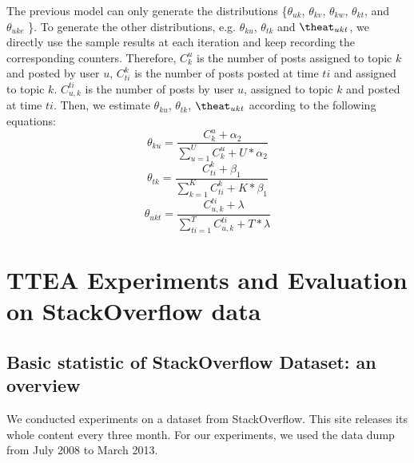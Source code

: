 {{{{{{{The previous model can only generate the distributions \{$\theta_{uk}$, $\theta_{kv}$, $\theta_{kw}$, $\theta_{kt}$, and $\theta_{uke}$ \}. To generate the other distributions, e.g. $\theta_{ku}$, $\theta_{tk}$ and $\theat_{ukt}$, we directly use the sample results at each iteration and keep recording the corresponding counters. Therefore, $C_k^u$ is the number of posts assigned to topic $k$ and posted by user $u$, $C_{ti}^k$ is the number of posts posted at time $ti$ and assigned to topic $k$. $C_{u,k}^{ti}$ is the number of posts by user $u$, assigned to topic $k$ and posted at time $ti$.
Then, we estimate $\theta_{ku}$, $\theta_{tk}$, $\theat_{ukt}$ according to the following equations:
\begin{equation}%
\theta_{ku}=\frac{ C_k^u + \alpha_2 }{ \sum_{u=1}^U C_k^u+ U* \alpha_2} 
\end{equation}
\begin{equation}%
\theta_{tk}=\frac{ C_{ti}^{k} + \beta_1 }{ \sum_{k=1}^{K} C_{ti}^{k}+ K* \beta_1}
\end{equation}
\begin{equation}%
\theta_{ukt}=\frac{ C_{u,k}^{ti} + \lambda }{ \sum_{ti=1}^T C_{u,k}^{ti}+ T* \lambda} 
\end{equation}



\section{TTEA Experiments and Evaluation on StackOverflow data}\label{sec:TTEAexperiment}

\subsection{Basic statistic of StackOverflow Dataset: an overview}


We conducted experiments on a dataset from StackOverflow. This site releases its whole content every three month. For our experiments, we used the data dump from July 2008 to March 2013. 

}}}}}}}

